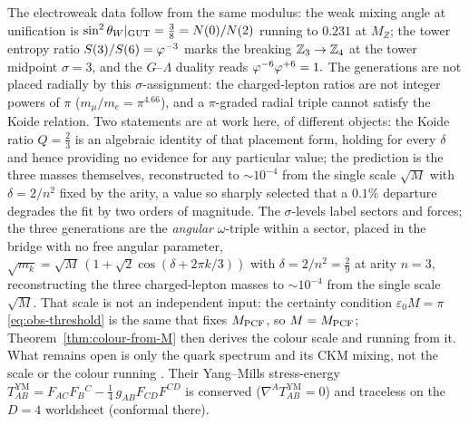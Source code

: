\begin{proposition}
The electroweak data follow from the same modulus: the weak mixing angle at unification is
$\sin^{2}\theta_W|_{\rm GUT}=\tfrac38=N(0)/N(2)$ 
running to $0.231$ at
$M_Z$; the tower entropy ratio $S(3)/S(6)=\varphi^{-3}$  marks the
breaking $\mathbb{Z}_3\to\mathbb{Z}_4$ at the tower midpoint $\sigma=3$, and the $G$--$\Lambda$ duality reads $\varphi^{-6}\varphi^{+6}=1.$
The generations are not placed radially by this $\sigma$-assignment:
the charged-lepton ratios are not integer powers of $\pi$ ($m_\mu/m_e=\pi^{4.66}$), and a
$\pi$-graded radial triple cannot satisfy the Koide relation. Two statements are at work here, of different objects: the Koide ratio $Q=\tfrac23$ is an algebraic identity of that placement form, holding for every $\delta$ and hence providing no evidence for any particular value; the prediction is the three masses themselves, reconstructed to $\sim10^{-4}$ from the single scale $\sqrt M$ with $\delta=2/n^{2}$ fixed by the arity, a value so sharply selected that a $0.1\%$ departure degrades the fit by two orders of magnitude. The $\sigma$-levels label sectors and
forces; the three generations are the \emph{angular} $\omega$-triple within a sector, placed in the
bridge with no free angular parameter,
$\sqrt{m_k}=\sqrt M\,(1+\sqrt2\cos(\delta+2\pi k/3))$ with $\delta=2/n^{2}=\tfrac29$ at arity $n=3$,
reconstructing the three charged-lepton masses to ${\sim}10^{-4}$ from the single scale $\sqrt M$.
That scale is not an independent input: the certainty condition $\varepsilon_0 M=\pi$ \eqref{eq:obs-threshold} is the same that fixes $M_{\mathrm{PCF}}$, so $M=M_{\mathrm{PCF}}$; Theorem~\ref{thm:colour-from-M} then derives the colour scale and running from it. What remains open is only the quark spectrum and its CKM mixing, not the scale or the colour running .
Their Yang--Mills stress-energy
$T^{\mathrm{YM}}_{AB}=F_{AC}F_{B}{}^{C}-\tfrac14\,g_{AB}F_{CD}F^{CD}$ is
conserved ($\nabla^{A}T^{\mathrm{YM}}_{AB}=0$) and traceless on the
$D=4$ worldsheet (conformal there).
\end{proposition}

